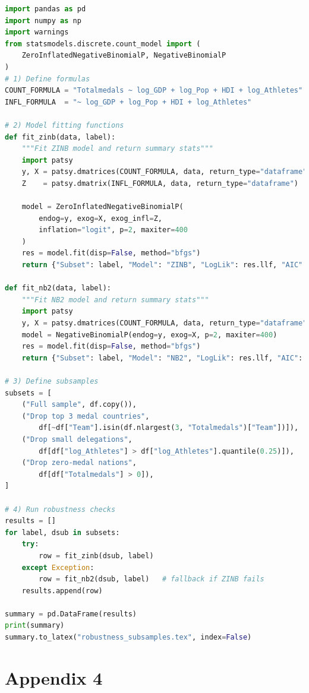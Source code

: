 \documentclass[11pt,twoside]{article}
\numberwithin{Theorem}{section}
\numberwithin{Definition}{section}
\numberwithin{Lemma}{section}
\numberwithin{Algorithm}{section}
\numberwithin{equation}{section}
\begin{document}
\begin{lstlisting}[language=Python, caption={Core code for subsample robustness checks of ZINB and NB2 models}, label={lst:subsample_robustness}]
import pandas as pd
import numpy as np
import warnings
from statsmodels.discrete.count_model import (
    ZeroInflatedNegativeBinomialP, NegativeBinomialP
)
# 1) Define formulas
COUNT_FORMULA = "Totalmedals ~ log_GDP + log_Pop + HDI + log_Athletes"
INFL_FORMULA  = "~ log_GDP + log_Pop + HDI + log_Athletes"

# 2) Model fitting functions
def fit_zinb(data, label):
    """Fit ZINB model and return summary stats"""
    import patsy
    y, X = patsy.dmatrices(COUNT_FORMULA, data, return_type="dataframe")
    Z    = patsy.dmatrix(INFL_FORMULA, data, return_type="dataframe")

    model = ZeroInflatedNegativeBinomialP(
        endog=y, exog=X, exog_infl=Z,
        inflation="logit", p=2, maxiter=400
    )
    res = model.fit(disp=False, method="bfgs")
    return {"Subset": label, "Model": "ZINB", "LogLik": res.llf, "AIC": res.aic}

def fit_nb2(data, label):
    """Fit NB2 model and return summary stats"""
    import patsy
    y, X = patsy.dmatrices(COUNT_FORMULA, data, return_type="dataframe")
    model = NegativeBinomialP(endog=y, exog=X, p=2, maxiter=400)
    res = model.fit(disp=False, method="bfgs")
    return {"Subset": label, "Model": "NB2", "LogLik": res.llf, "AIC": res.aic}

# 3) Define subsamples
subsets = [
    ("Full sample", df.copy()),
    ("Drop top 3 medal countries",
        df[~df["Team"].isin(df.nlargest(3, "Totalmedals")["Team"])]),
    ("Drop small delegations",
        df[df["log_Athletes"] > df["log_Athletes"].quantile(0.25)]),
    ("Drop zero-medal nations",
        df[df["Totalmedals"] > 0]),
]

# 4) Run robustness checks
results = []
for label, dsub in subsets:
    try:
        row = fit_zinb(dsub, label)
    except Exception:
        row = fit_nb2(dsub, label)   # fallback if ZINB fails
    results.append(row)

summary = pd.DataFrame(results)
print(summary)
summary.to_latex("robustness_subsamples.tex", index=False)

\end{lstlisting}

\clearpage

\section{Appendix 4}
\label{app:one}
\end{document}
